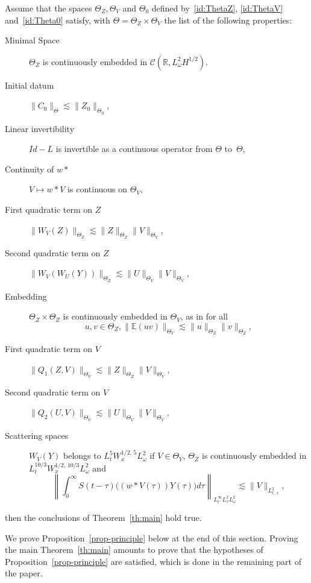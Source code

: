 \documentclass[10pt]{amsart}
\theoremstyle{definition}\newtheorem{defi}[theo]{Definition}\newtheorem{rema}[theo]{Remark}\newtheorem{exam}[theo]{Example}\newtheorem{exem}[theo]{Example}\newtheorem{nota}[theo]{Notation}
\newcommand{\R}{\mathbb{R}}
\newcommand{\E}{\mathbb{E}}
\newcommand{\mclC}{\mathcal{C}}
\begin{document}
\begin{prop}\label{prop-principle}
Assume that the spaces $\Theta_Z, \Theta_V$ and $\Theta_0$ defined by~\eqref{id:ThetaZ}, \eqref{id:ThetaV} and~\eqref{id:Theta0} satisfy, with $\Theta = \Theta_Z \times \Theta_V$ the list of the following properties:
\begin{description}
\item[Minimal Space]\label{prop3.1.1} $\Theta_Z$ is continuously embedded in $\mclC (\R, L^2_\omega H^{1/2}) $.
\item[Initial datum]\label{prop3.1.2} $\|C_0\|_\Theta \lesssim \|Z_0\|_{\Theta_0}$,
\item[Linear invertibility]\label{prop3.1.3} $Id-L$ is invertible as a continuous operator from $\Theta$ to~$\Theta$,
\item[Continuity of $w*$]\label{prop3.1.4} $V\mapsto w* V$ is continuous on $\Theta_V$,
\item[First quadratic term on $Z$]\label{prop3.1.5} $\|W_V(Z)\|_{\Theta_Z} \lesssim \|Z\|_{\Theta_Z} \|V\|_{\Theta_V}$,
\item[Second quadratic term on $Z$]\label{prop3.1.6} $\|W_V(W_U(Y))\|_{\Theta_Z} \lesssim \|U\|_{\Theta_V} \|V\|_{\Theta_V}$,
\item[Embedding]\label{prop3.1.7} $\Theta_Z \times \Theta_Z$ is continuously embedded in $\Theta_V$, as in for all
\[
u,v \in \Theta_Z, \|\E(uv)\|_{\Theta_V} \lesssim \|u\|_{\Theta_Z} \|v\|_{\Theta_Z},
\]
\item[First quadratic term on $V$]\label{prop3.1.8} $\|Q_1(Z,V)\|_{\Theta_V} \lesssim \|Z\|_{\Theta_Z} \|V\|_{\Theta_V}$,
\item[Second quadratic term on $V$]\label{prop3.1.9} $
 \|Q_2(U,V) \|_{\Theta_V} \lesssim \|U\|_{\Theta_V} \|V\|_{\Theta_V}, $
\item[Scattering spaces]\label{prop3.1.10} $W_V(Y)$ belongs to $L^5_t W^{1/2,\,5}_xL^2_\omega$ if $V\in \Theta_V$, $\Theta_Z$ is continuously embedded in $L^{10/3}_t W^{1/2,\,10/3}_x L^2_\omega$ and
\[
\left\|\int_{0}^\infty S(t-\tau) \Big((w*V(\tau)) Y(\tau) \Big)d\tau\right\|_{L^{\infty}_tL^3_x L^2_\omega} \lesssim \|V\|_{L^2_{t,\,x}},
\]
\end{description}
then the conclusions of Theorem~\ref{th:main} hold true.
\end{prop}



We prove Proposition~\ref{prop-principle} below at the end of this section. Proving the main Theorem~\ref{th:main} amounts to prove that the hypotheses of Proposition~\ref{prop-principle} are satisfied, which is done in the remaining part of the paper.
\end{document}

